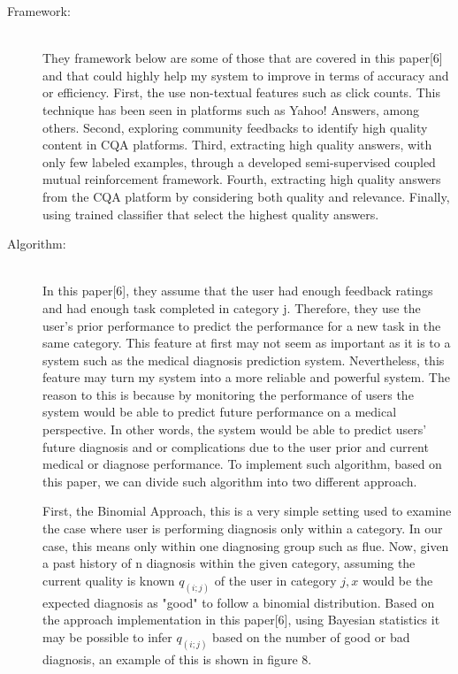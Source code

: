 \documentclass[sts]{sig-alternate}
\begin{document}
		\begin{description}
  			\item[Framework:] \hfill \\
				They framework below are some of those that are covered in this paper[6] and that could 					highly help my system to improve in terms of accuracy and or efficiency. First, the use 					non-textual 	features such as click counts. This technique has been seen in platforms 						such as Yahoo! Answers, among others. Second, exploring community feedbacks to identify 					high quality content in CQA platforms. Third, extracting high quality answers, with only 				few labeled 	examples, through a developed semi-supervised coupled mutual reinforcement 					framework. Fourth, extracting high quality answers from the CQA platform by considering 					both quality and relevance. Finally, using trained classifier that select the highest 					quality answers.					
  			
  			\item[Algorithm:] \hfill \\
 				In this paper[6], they assume that the user had enough feedback ratings and had enough 					task completed in category j. Therefore, they use the user's prior performance to 						predict the 	performance for a new task in the same category. This feature at first may 					not seem as important as it is to a system such as the medical diagnosis prediction 						system. Nevertheless, this feature may turn my system into a more reliable and powerful 					system. The 	reason to this is because by monitoring the performance of users the system 				would be able to predict future performance on a medical perspective. In other words, 					the system would be able to predict users' future diagnosis and or complications due to 					the user prior and current medical or diagnose performance. To implement such algorithm, 				based on this paper, we can divide such algorithm into two different approach.\newline 

				First, the Binomial Approach, this is a very simple setting used to examine the case 						where user is performing diagnosis only within a category. In our case, this means only 					within one diagnosing group such as flue. Now, given a past history of n diagnosis 						within the given category, assuming the current quality is known $q_(i; j)$ of the user 					in category $j, x$ would be the expected diagnosis as "good" to follow a binomial 						distribution. Based on the approach implementation in this paper[6], using Bayesian 						statistics it may be possible to infer $q_(i; j)$ based on the number of good or bad 						diagnosis, an example of this is shown in figure 8.\newline 


\end{description}
\end{document}

